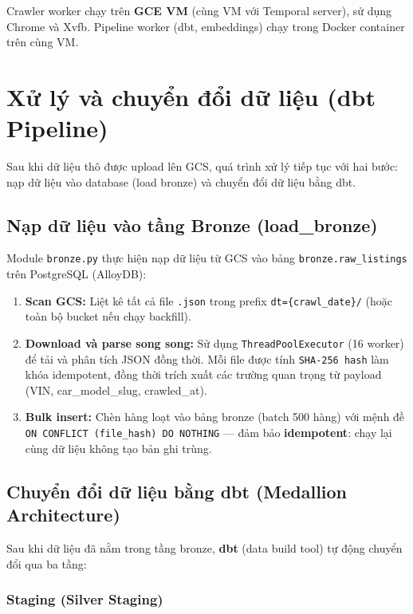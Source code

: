 Crawler worker chạy trên \textbf{GCE VM} (cùng VM với Temporal server), sử dụng Chrome và Xvfb. Pipeline worker (dbt, embeddings) chạy trong Docker container trên cùng VM.

\section{Xử lý và chuyển đổi dữ liệu (dbt Pipeline)}

Sau khi dữ liệu thô được upload lên GCS, quá trình xử lý tiếp tục với hai bước: nạp dữ liệu vào database (load bronze) và chuyển đổi dữ liệu bằng dbt.

\subsection{Nạp dữ liệu vào tầng Bronze (load\_bronze)}

Module \texttt{bronze.py} thực hiện nạp dữ liệu từ GCS vào bảng \texttt{bronze.raw\_listings} trên PostgreSQL (AlloyDB):

\begin{enumerate}
    \item \textbf{Scan GCS:} Liệt kê tất cả file \texttt{.json} trong prefix \texttt{dt=\{crawl\_date\}/} (hoặc toàn bộ bucket nếu chạy backfill).
    \item \textbf{Download và parse song song:} Sử dụng \texttt{ThreadPoolExecutor} (16 worker) để tải và phân tích JSON đồng thời. Mỗi file được tính \texttt{SHA-256 hash} làm khóa idempotent, đồng thời trích xuất các trường quan trọng từ payload (VIN, car\_model\_slug, crawled\_at).
    \item \textbf{Bulk insert:} Chèn hàng loạt vào bảng bronze (batch 500 hàng) với mệnh đề \texttt{ON CONFLICT (file\_hash) DO NOTHING} — đảm bảo \textbf{idempotent}: chạy lại cùng dữ liệu không tạo bản ghi trùng.
\end{enumerate}

\subsection{Chuyển đổi dữ liệu bằng dbt (Medallion Architecture)}

Sau khi dữ liệu đã nằm trong tầng bronze, \textbf{dbt} (data build tool) tự động chuyển đổi qua ba tầng:

\subsubsection{Staging (Silver Staging)}

